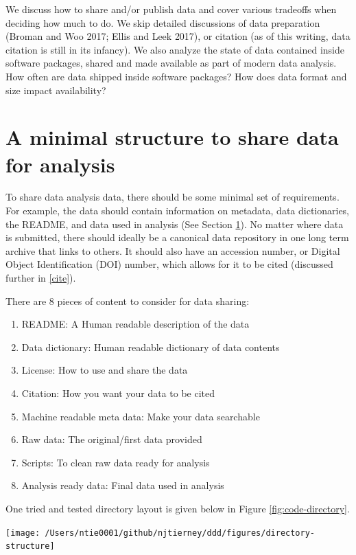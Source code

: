 \documentclass[
]{article}
\providecommand{\tightlist}{%
  \setlength{\itemsep}{0pt}\setlength{\parskip}{0pt}}
\let\origfigure\figure
\let\endorigfigure\endfigure
\renewenvironment{figure}[1][2] {
    \expandafter\origfigure\expandafter[H]
} {
    \endorigfigure
}
\begin{document}
We discuss how to share and/or publish data and cover various tradeoffs when deciding how much to do. We skip detailed discussions of data preparation (Broman and Woo 2017; Ellis and Leek 2017), or citation (as of this writing, data citation is still in its infancy). We also analyze the state of data contained inside software packages, shared and made available as part of modern data analysis. How often are data shipped inside software packages? How does data format and size impact availability?

\hypertarget{minimal}{%
\section{A minimal structure to share data for analysis}\label{minimal}}

To share data analysis data, there should be some minimal set of requirements. For example, the data should contain information on metadata, data dictionaries, the README, and data used in analysis (See Section \ref{minimal}). No matter where data is submitted, there should ideally be a canonical data repository in one long term archive that links to others. It should also have an accession number, or Digital Object Identification (DOI) number, which allows for it to be cited (discussed further in \ref{cite}).

There are 8 pieces of content to consider for data sharing:

\begin{enumerate}
\def\labelenumi{\arabic{enumi}.}
\tightlist
\item
  README: A Human readable description of the data
\item
  Data dictionary: Human readable dictionary of data contents
\item
  License: How to use and share the data
\item
  Citation: How you want your data to be cited
\item
  Machine readable meta data: Make your data searchable
\item
  Raw data: The original/first data provided
\item
  Scripts: To clean raw data ready for analysis
\item
  Analysis ready data: Final data used in analysis
\end{enumerate}

One tried and tested directory layout is given below in Figure \ref{fig:code-directory}.

\begin{figure}

{\centering \texttt{[image: /Users/ntie0001/github/njtierney/ddd/figures/directory-structure]} 

}

\caption{Example directory layout and structure for a data repository.}\label{fig:code-directory}
\end{figure}
\end{document}

